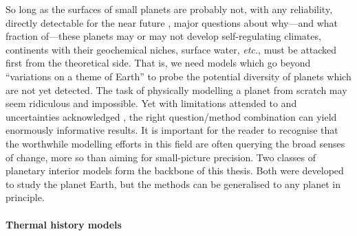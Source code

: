 So long as the surfaces of small planets are probably not, with any reliability, directly detectable for the near future \citep[see also footnote \ref{foot:diffraction-limit}]{teinturier_mapping_2022}, major questions about why---and what fraction of---these planets may or may not develop self-regulating climates, continents with their geochemical niches, surface water, \textit{etc.}, must be attacked first from the theoretical side. That is, we need models which go beyond ``variations on a theme of Earth'' \citep{unterborn_exogeoscience_2020} to probe the potential diversity of planets which are not yet detected. %
The task of physically modelling a planet from scratch may seem ridiculous and impossible. Yet with limitations attended to and uncertainties acknowledged \citep[e.g.,][]{seales_assessing_2019}, the right question/method combination can yield enormously informative results. It is important for the reader to recognise that the worthwhile modelling efforts in this field are often querying the broad senses of change, %
more so than aiming for small-picture precision. Two classes of planetary interior models form the backbone of this thesis. Both were developed to study the planet Earth, but the methods can be generalised to any planet in principle.

\paragraph{Thermal history models} 

